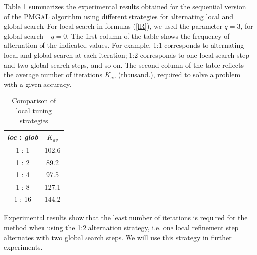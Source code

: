 \documentclass[
11pt,%
tightenlines,%
twoside,%
onecolumn,%
nofloats,%
nobibnotes,%
nofootinbib,%
superscriptaddress,%
noshowpacs,%
centertags]%
{revtex4}
\begin{document}
Table \ref{tab:2} summarizes the experimental results obtained for the sequential version of the PMGAL algorithm using different strategies for alternating local and global search. For local search in formulas  (\ref{lR}), we used the parameter $q=3$, for global search -- $q=0$. The first column of the table shows the frequency of alternation of the indicated values. For example, 1:1 corresponds to alternating local and global search at each iteration; 1:2 corresponds to one local search step and two global search steps, and so on. The second column of the table reflects the average number of iterations  $K_{av}$ (thousand.), required to solve a problem with a given accuracy.

\begin{table}[ht]
	\caption{Comparison of local tuning strategies}
	\label{tab:2}
	\center
	\begin{tabular}{|c|c|}
		\hline		
		\textit{loc} : \textit{glob} & $K_{av}$   \\
		\hline 
		1 : 1 & 102.6\\
		1 : 2 & 89.2\\
		1 : 4 & 97.5\\
		1 : 8 & 127.1\\
		1 : 16 & 144.2\\
		\hline
	\end{tabular}
\end{table}	


Experimental results show that the least number of iterations is required for the method when using the 1:2 alternation strategy, i.e. one local refinement step alternates with two global search steps. We will use this strategy in further experiments.

\end{document}
